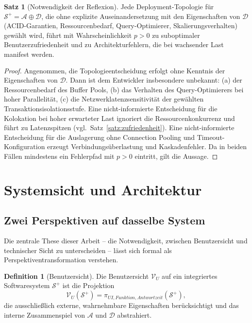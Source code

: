 ﻿\documentclass[a4paper,12pt]{article}
\theoremstyle{definition}
\newtheorem{definition}{Definition}
\newtheorem{satz}{Satz}
\begin{document}
\begin{satz}[Notwendigkeit der Reflexion]
\label{satz:reflexion}
Jede Deployment-Topologie für $\mathcal{S}^+ = \mathcal{A} \oplus \mathcal{D}$, die ohne explizite Auseinandersetzung mit den Eigenschaften von $\mathcal{D}$ (ACID-Garantien, Ressourcenbedarf, Query-Optimierer, Skalierungsverhalten) gewählt wird, führt mit Wahrscheinlichkeit $p > 0$ zu suboptimaler Benutzerzufriedenheit und zu Architekturfehlern, die bei wachsender Last manifest werden.
\end{satz}

\begin{proof}
Angenommen, die Topologieentscheidung erfolgt ohne Kenntnis der Eigenschaften von $\mathcal{D}$. Dann ist dem Entwickler insbesondere unbekannt: (a) der Ressourcenbedarf des Buffer Pools, (b) das Verhalten des Query-Optimierers bei hoher Parallelität, (c) die Netzwerklatenzsensitivität der gewählten Transaktionsisolationsstufe. Eine nicht-informierte Entscheidung für die Kolokation bei hoher erwarteter Last ignoriert die Ressourcenkonkurrenz und führt zu Latenzspitzen (vgl.\ Satz~\ref{satz:zufriedenheit}). Eine nicht-informierte Entscheidung für die Auslagerung ohne Connection Pooling und Timeout-Konfiguration erzeugt Verbindungsüberlastung und Kaskadenfehler. Da in beiden Fällen mindestens ein Fehlerpfad mit $p > 0$ eintritt, gilt die Aussage.
\end{proof}

\section{Systemsicht und Architektur}
\label{sec:architektur}

\subsection{Zwei Perspektiven auf dasselbe System}

Die zentrale These dieser Arbeit -- die Notwendigkeit, zwischen Benutzersicht und technischer Sicht zu unterscheiden -- lässt sich formal als Perspektiventransformation verstehen.

\begin{definition}[Benutzersicht]
\label{def:benutzersicht}
Die Benutzersicht $\mathcal{V}_U$ auf ein integriertes Softwaresystem $\mathcal{S}^+$ ist die Projektion
\[
\mathcal{V}_U(\mathcal{S}^+) = \pi_{\mathit{UI}, \mathit{Funktion}, \mathit{Antwortzeit}}(\mathcal{S}^+),
\]
die ausschließlich externe, wahrnehmbare Eigenschaften berücksichtigt und das interne Zusammenspiel von $\mathcal{A}$ und $\mathcal{D}$ abstrahiert.
\end{definition}
\end{document}

